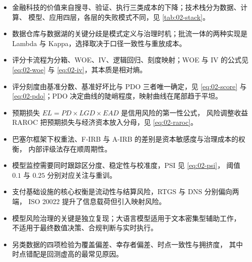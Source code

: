 \begin{summarybox}
\begin{itemize}[leftmargin=1.4em, itemsep=2pt]
  \item 金融科技的价值来自搜寻、验证、执行三类成本的下降；技术栈分为数据、计算、
        模型、应用四层，各层的失败模式不同，见 \cref{tab:02-stack}。
  \item 数据仓库与数据湖的关键分歧是模式定义与治理时机；批流一体的两种实现是
        Lambda 与 Kappa，选择取决于口径一致性与重放成本。
  \item 评分卡流程为分箱、WOE、IV、逻辑回归、刻度映射；WOE 与 IV 的公式见
        \cref{eq:02-woe} 与 \cref{eq:02-iv}，其本质是相对熵。
  \item 评分刻度由基准分数、基准好坏比与 PDO 三者唯一确定，见 \cref{eq:02-score}
        与 \cref{eq:02-pdo}；PDO 决定曲线的陡峭程度，映射曲线在尾部趋于平坦。
  \item 预期损失 $EL = PD \times LGD \times EAD$ 是信用风险的第一性公式，
        风险调整收益 RAROC 把预期损失与经济资本放入分母，见 \cref{eq:02-raroc}。
  \item 巴塞尔框架下权重法、F-IRB 与 A-IRB 的差别是资本敏感度与治理成本的权衡，
        内部评级法存在顺周期性。
  \item 模型监控需要同时跟踪区分度、稳定性与校准度，PSI 见 \cref{eq:02-psi}，
        阈值 $0.1$ 与 $0.25$ 分别对应关注与重训。
  \item 支付基础设施的核心权衡是流动性与结算风险，RTGS 与 DNS 分别偏向两端，
        ISO 20022 提升了信息载荷但引入映射风险。
  \item 模型风险治理的关键是独立复现；大语言模型适用于文本密集型辅助工作，
        不适用于最终数值决策、合规判断与实时执行。
  \item 另类数据的四项检验为覆盖偏差、幸存者偏差、时点一致性与拥挤度，
        其中时点错配是回测虚高的最常见原因。
\end{itemize}
\end{summarybox}

